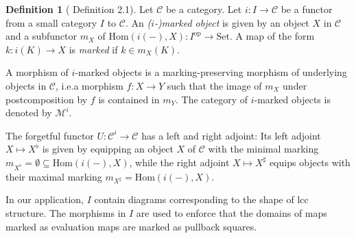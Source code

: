\documentclass[a4paper]{article}
\theoremstyle{remark}
\theoremstyle{definition}
\newtheorem{definition}[theorem]{Definition}
\begin{document}
\begin{definition}[\cite{marked-objects} Definition 2.1]
  Let $\mathcal{C}$ be a category.
  Let $i : I \rightarrow \mathcal{C}$ be a functor from a small category $I$ to $\mathcal{C}$.
  An \emph{($i$-)marked object} is given by an object $X$ in $\mathcal{C}$ and a subfunctor $m_X$ of $\mathrm{Hom}(i(-), X) : I^\mathrm{op} \rightarrow \mathrm{Set}$.
  A map of the form $k : i(K) \rightarrow X$ is \emph{marked} if $k \in m_X(K)$.

  A morphism of $i$-marked objects is a marking-preserving morphism of underlying objects in $\mathcal{C}$, i.e.\@ a morphism $f : X \rightarrow Y$ such that the image of $m_X$ under postcomposition by $f$ is contained in $m_Y$.
  The category of $i$-marked objects is denoted by $\mathcal{M}^i$.
\end{definition}

The forgetful functor $U : \mathcal{C}^i \rightarrow \mathcal{C}$ has a left and right adjoint:
Its left adjoint $X \mapsto X^\flat$ is given by equipping an object $X$ of $\mathcal{C}$ with the minimal marking $m_{X^\flat} = \emptyset \subseteq \mathrm{Hom}(i(-), X)$, while the right adjoint $X \mapsto X^\sharp$ equips objects with their maximal marking $m_{X^\sharp} = \mathrm{Hom}(i(-), X)$.

In our application, $I$ contain diagrams corresponding to the shape of lcc structure.
The morphisms in $I$ are used to enforce that the domains of maps marked as evaluation maps are marked as pullback squares.
\end{document}
